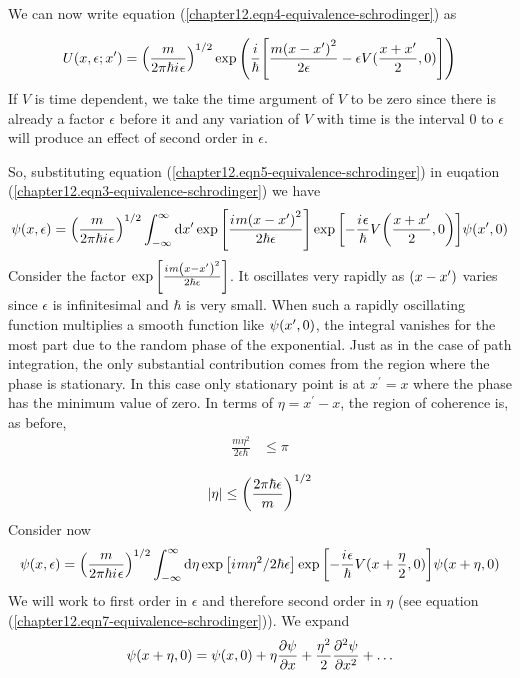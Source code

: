 	We can now write equation (\ref{chapter12.eqn4-equivalence-schrodinger}) as
	
	\begin{equation}
		U(x, \epsilon; x^\prime) = \qty(\frac{m}{2\pi \hbar {i\mkern1mu} \epsilon})^{1/2} \exp\qty(\frac{i}{\hbar} \qty[\frac{m\qty(x-x^\prime)^2}{2 \epsilon}  -\epsilon V(\frac{x+x^\prime}{2}, 0)])
		\label{chapter12.eqn5-equivalence-schrodinger}
	\end{equation}
	If $V$ is time dependent, we take the time argument of $V$ to be zero since there is already a factor $\epsilon$ before it and any variation of $V$ with time is the interval $0$ to $\epsilon$ will produce an effect of second order in $\epsilon$.
	
	So, substituting equation (\ref{chapter12.eqn5-equivalence-schrodinger}) in euqation (\ref{chapter12.eqn3-equivalence-schrodinger}) we have
	\begin{equation}
		\psi\qty(x, \epsilon) = \qty(\frac{m}{2\pi\hbar{i\mkern1mu} \epsilon})^{1/2} \int_{-\infty}^{\infty} \dd{x^\prime} \exp\qty[\frac{{i\mkern1mu} m \qty(x-x^\prime)^2}{2 \hbar \epsilon}]   \exp\qty[-\frac{{i\mkern1mu} \epsilon}{\hbar} V\qty(\frac{x+ x^\prime}{2}, 0)]\psi\qty(x^\prime, 0)
		\label{chapter12.eqn6-equivalence-schrodinger}
	\end{equation}
	Consider the factor $\exp\qty[\frac{{i\mkern1mu} m \qty(x-x^\prime)^2}{2 \hbar \epsilon}]$. It oscillates very rapidly as $\qty(x-x^\prime)$ varies since $\epsilon$ is infinitesimal and $\hbar$ is very small. When such a rapidly oscillating function multiplies a smooth function like $\psi\qty(x^\prime, 0)$, the integral vanishes for the most part due to the random phase of the exponential. Just as in the case of path integration, the only substantial contribution comes from the region where the phase is stationary. In this case only stationary point is at $x^\prime = x$ where the phase has the minimum value of zero. In terms of $\eta = x^\prime - x$, the region of coherence is, as before,
	\begin{align*}
		\frac{m \eta^2}{2\epsilon	\hbar} &\leq \pi
	\end{align*}
	
	\begin{align}
		\abs{\eta } \leq \qty(\frac{2 \pi \hbar \epsilon}{m})^{1/2}
		\label{chapter12.eqn7-equivalence-schrodinger}
	\end{align}
	Consider now
	\begin{equation}
		\psi(x, \epsilon) = \qty(\frac{m}{2\pi \hbar {i\mkern1mu} \epsilon})^{1/2} \int_{-\infty}^{\infty} \dd{\eta} \exp\qty[{i\mkern1mu} m \eta^2/2 \hbar \epsilon] \exp\qty[-\frac{{i\mkern1mu} \epsilon}{\hbar} V(x + \frac{\eta}{2}, 0)]  \psi\qty(x + \eta, 0)
		\label{chapter12.eqn8-equivalence-schrodinger}
	\end{equation}
	We will work to first order in $\epsilon$ and therefore second order in $\eta$ (see equation (\ref{chapter12.eqn7-equivalence-schrodinger})). We expand
	\begin{equation}
		\psi\qty(x + \eta, 0) = \psi\qty(x, 0) + \eta \pdv{\psi}{x} + \frac{\eta^2}{2} \pdv[2]{\psi}{x} + \ldots
	\end{equation}
	
